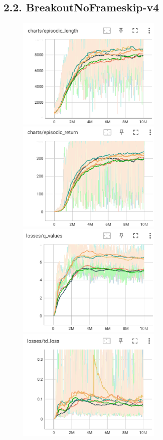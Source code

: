 \documentclass[english, a4paper,12pt]{article}
\begin{document}
\subsection*{2.2. BreakoutNoFrameskip-v4}
\begin{figure}[h!]
    \begin{minipage}{0.5\textwidth}

        \includegraphics[width=7cm]{episodic_length_breakout.png} 
        \includegraphics[width=7cm]{episodic_return_breakout.png}
        \includegraphics[width=7cm]{q_values_breakout.png}
        \includegraphics[width=7cm]{td_loss_breakout.png}

\end{minipage}
\end{figure}
\end{document}
